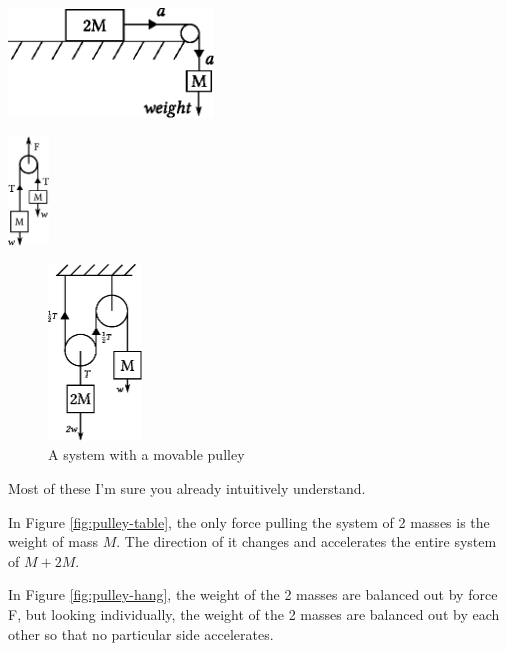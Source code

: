 \documentclass[11pt]{article}
\numberwithin{equation}{section}
\newenvironment{multicolFigure}
{\par\medskip\noindent\minipage{\linewidth}}
{\endminipage\par\medskip}
\begin{document}
			\begin{multicols}{2}
				\begin{multicolFigure}
					\centering
					\includegraphics[height=2.9cm]{pulley.eps}
					\label{fig:pulley-table}
				\end{multicolFigure}
				\begin{multicolFigure}
					\centering
					\includegraphics[height=2.9cm]{pulley2.eps}
					\label{fig:pulley-hang}
				\end{multicolFigure}
			\end{multicols}
		
			\begin{figure}
				\centering
				\includegraphics[width=2.5cm]{movablepulley.eps}
				\caption{A system with a movable pulley}
				\label{fig:movablepulley}
				\vspace{-1cm}
			\end{figure}
		
			Most of these I'm sure you already intuitively understand.
			
			In Figure \ref{fig:pulley-table}, the only force pulling the system of 2 masses is the weight of mass $M$. The direction of it changes and accelerates the entire system of $M+2M$. 
			
			In Figure \ref{fig:pulley-hang}, the weight of the 2 masses are balanced out by force F, but looking individually, the weight of the 2 masses are balanced out by each other so that no particular side accelerates.
			
\end{document}
